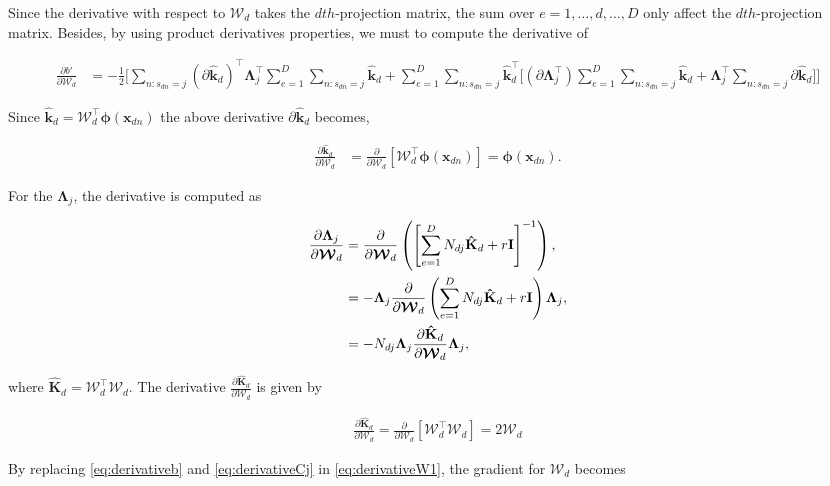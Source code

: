 \documentclass[]{article}
\newcommand{\dWj}{\partial\projMat}
\newcommand{\C}{\boldsymbol{\Lambda}_j}
\newcommand{\eye}{\mathbf{I}}
\newcommand{\indobj}{\mathbf{x}_{dn}}
\newcommand{\projMat}{\boldsymbol{\mathcal{W}}_d}
\newcommand{\phixnd}{\boldsymbol{\phi}\left(\indobj\right)}
\newcommand{\kawx}{\mathbf{\hat{k}}_d }
\newcommand{\Kaww}{\mathbf{\hat{K}}_d }
\begin{document}
Since the derivative with respect to $\projMat$ takes the $dth$-projection matrix, the sum over $e = 1, \dots, d, \dots, D$ only affect the $dth$-projection matrix. Besides, by using product derivatives properties, we must to compute the derivative of 

\begin{align}
\frac{\partial b'}{\dWj} &=  -\frac{1}{2}\Big[\sum\limits_{n:s_{dn}=j}  \left(\partial \kawx\right)^\top\C^\top \sum\limits_{e=1}^{D}\sum\limits_{n:s_{dn}=j}\kawx + \sum\limits_{e=1}^{D}\sum\limits_{n:s_{dn}=j}\kawx^\top \Big[\left(\partial \C^\top\right) \sum\limits_{e=1}^{D}\sum\limits_{n:s_{dn}=j} \kawx +\C^\top \sum\limits_{n:s_{dn}=j} \partial\kawx\Big]
\Big]
\label{eq:derivativeb}
\end{align}

Since $\kawx = \projMat^\top\phixnd$ the above derivative $\partial \kawx$ becomes,

\begin{align}
\frac{\partial \kawx}{\dWj} &= \frac{\partial }{\dWj}\left[\projMat^\top\phixnd\right]= \phixnd.
\end{align}

For the $\C$, the derivative is computed as

\begin{align}
\frac{\partial \C}{\dWj} &= \frac{\partial}{\dWj}\left( \left[\sum_{e=1}^{D}N_{dj}\mathbf{\hat{K}}_d + r\eye\right]^{-1}\right),\notag \\
&= -\C\frac{\partial}{\dWj}\left( \sum_{e=1}^{D}N_{dj}\mathbf{\hat{K}}_d + r\eye\right) \C,\notag \\
&= -N_{dj}\C\frac{ \partial \mathbf{\hat{K}}_d}{\dWj} \C,
\label{eq:derivativeCj}
\end{align}

where $\Kaww  = \projMat^\top\projMat$. The derivative $\frac{\partial \Kaww}{\dWj}$ is given by

\begin{align}
\frac{\partial \Kaww}{\dWj} = \frac{\partial}{\dWj}\left[\projMat^\top\projMat\right] = 2\projMat
\end{align}


By replacing \eqref{eq:derivativeb} and \eqref{eq:derivativeCj} in \eqref{eq:derivativeW1}, the gradient for $\projMat$ becomes
\end{document}
